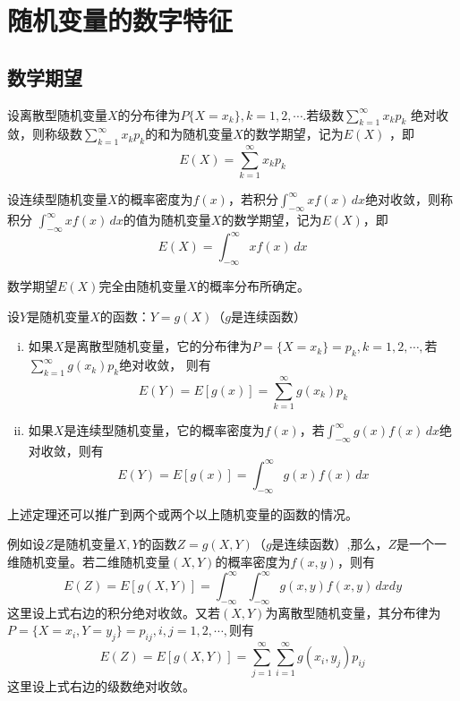 \section{随机变量的数字特征}

\subsection{数学期望}
\begin{definition}[数学期望]
    设离散型随机变量$X$的分布律为$P\{X=x_k\},k=1,2,\cdots.$若级数$\displaystyle{\sum_{k=1}^\infty x_kp_k}$
    绝对收敛，则称级数$\displaystyle{\sum_{k=1}^\infty x_kp_k}$的和为随机变量$X$的{\heiti 数学期望}，记为$E(X)$
    ，即$$E(X)=\sum_{k=1}^\infty x_kp_k$$

    设连续型随机变量$X$的概率密度为$f(x)$，若积分$\displaystyle{\int _{-\infty}^\infty xf(x) \,dx}$绝对收敛，则称积分
    $\displaystyle{\int _{-\infty}^\infty xf(x) \,dx}$的值为随机变量$X$的{\heiti 数学期望}，记为$E(X)$，即
    $$E(X)=\int _{-\infty}^\infty xf(x) \,dx$$
    
    数学期望$E(X)$完全由随机变量$X$的概率分布所确定。
\end{definition}

\begin{theorem}
    设$Y$是随机变量$X$的函数：$Y=g(X)$（$g$是连续函数）
    \begin{enumerate}[(i)]
        \item 如果$X$是离散型随机变量，它的分布律为$P=\{X=x_k\}=p_k,k=1,2,\cdots,$若$\displaystyle{\sum _{k=1}^\infty g(x_k)p_k}$绝对收敛，
        则有 $$E(Y)=E[g(x)]=\sum _{k=1}^\infty g(x_k)p_k$$
        \item 如果$X$是连续型随机变量，它的概率密度为$f(x)$，若$\displaystyle{\int _{-\infty}^\infty g(x)f(x)\,dx}$绝对收敛，则有
        $$E(Y)=E[g(x)]=\int _{-\infty}^\infty g(x)f(x)\,dx$$
    \end{enumerate}
    
    上述定理还可以推广到两个或两个以上随机变量的函数的情况。

    例如设$Z$是随机变量$X,Y$的函数$Z=g(X,Y)$（$g$是连续函数）,那么，$Z$是一个一维随机变量。若二维随机变量$(X,Y)$的概率密度为$f(x,y)$，则有
    $$E(Z)=E[g(X,Y)]=\int _{-\infty}^\infty\int _{-\infty}^\infty g(x,y)f(x,y)\,dxdy$$
    这里设上式右边的积分绝对收敛。又若$(X,Y)$为离散型随机变量，其分布律为$P=\{X=x_i,Y=y_j\}=p_{ij},i,j=1,2,\cdots,$则有
    $$E(Z)=E[g(X,Y)]=\sum _{j=1}^\infty \sum_{i=1}^\infty g(x_i,y_j)p_{ij}$$
    这里设上式右边的级数绝对收敛。
\end{theorem}


